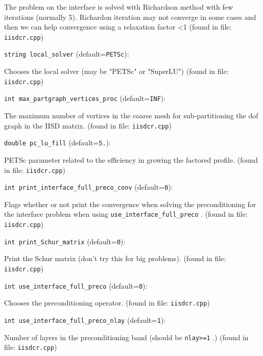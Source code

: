The problem on the interface is solved with Richardson method
with few iterations (normally 5). Richardon iteration may not
converge in some cases and then we can help convergence using a
relaxation factor <1
 (found in file: \verb+iisdcr.cpp+)
\item\verb+string local_solver+ {\rm(default=\verb|PETSc|)}:

Chooses the local solver (may be "PETSc" or "SuperLU")
 (found in file: \verb+iisdcr.cpp+)
\item\verb+int max_partgraph_vertices_proc+ {\rm(default=\verb|INF|)}:

The maximum number of vertices in the coarse mesh for
sub-partitioning the dof graph in the IISD matrix. 
 (found in file: \verb+iisdcr.cpp+)
\item\verb+double pc_lu_fill+ {\rm(default=\verb|5.|)}:

PETSc parameter related to the efficiency in growing
  the factored profile.
 (found in file: \verb+iisdcr.cpp+)
\item\verb+int print_interface_full_preco_conv+ {\rm(default=\verb|0|)}:

Flags whether or not print the convergence when solving the
preconditioning for the interface problem when using
 \verb+use_interface_full_preco+ .
 (found in file: \verb+iisdcr.cpp+)
\item\verb+int print_Schur_matrix+ {\rm(default=\verb|0|)}:

Print the Schur matrix (don't try this for big problems).
 (found in file: \verb+iisdcr.cpp+)
\item\verb+int use_interface_full_preco+ {\rm(default=\verb|0|)}:

Chooses the preconditioning operator. 
 (found in file: \verb+iisdcr.cpp+)
\item\verb+int use_interface_full_preco_nlay+ {\rm(default=\verb|1|)}:

Number of layers in the preconditioning band (should
 be  \verb+nlay>=1+ .) 
 (found in file: \verb+iisdcr.cpp+)
